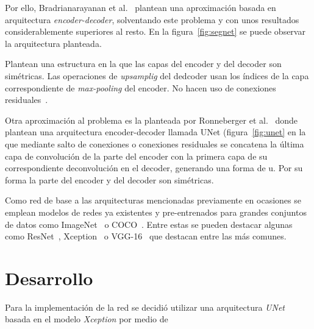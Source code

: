 \documentclass[a4paper]{article}
\begin{document}
Por ello, Bradrianarayanan et al.~\cite{encoderDecoder} plantean una aproximaci\'on basada en arquitectura \textit{encoder-decoder}, solventando este problema y con unos resultados considerablemente superiores al resto.
En la figura~\ref{fig:segnet} se puede observar la arquitectura planteada.
\newline

Plantean una estructura en la que las capas del encoder y del decoder son sim\'etricas.
Las operaciones de \textit{upsamplig} del dedcoder usan los \'indices de la capa correspondiente de \textit{max-pooling} del encoder.
No hacen uso de conexiones residuales~\cite{resnet}.
\newline

Otra aproximaci\'on al problema es la planteada por Ronneberger et al.~\cite{unet} donde plantean una arquitectura encoder-decoder llamada UNet (figura~\ref{fig:unet} en la que mediante salto de conexiones o conexiones residuales se concatena la \'ultima capa de convoluci\'on de la parte del encoder con la primera capa de su correspondiente deconvoluci\'on en el decoder, generando una forma de u.
Por su forma la parte del encoder y del decoder son sim\'etricas.
\newline

Como red de base a las arquitecturas mencionadas previamente en ocasiones se emplean modelos de redes ya existentes y pre-entrenados para grandes conjuntos de datos como ImageNet~\cite{imagenet} o COCO~\cite{coco}.
Entre estas se pueden destacar algunas como ResNet~\cite{resnet}, Xception~\cite{xception} o VGG-16~\cite{vgg} que destacan entre las m\'as comunes.



\section{Desarrollo}
Para la implementación de la red se decidió utilizar una arquitectura \textit{UNet} basada en el modelo \textit{Xception} por medio de 
\end{document}
